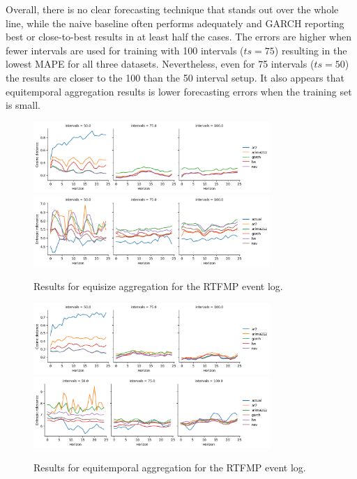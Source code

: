 Overall, there is no clear forecasting technique that stands out over the whole line, while the naive baseline often performs adequately and GARCH reporting best or close-to-best results in at least half the cases.
The errors are higher when fewer intervals are used for training with 100 intervals ($ts=75$) resulting in the lowest MAPE for all three datasets.
Nevertheless, even for 75 intervals ($ts=50$) the results are closer to the 100 than the 50 interval setup.
It also appears that equitemporal aggregation results is lower forecasting errors when the training set is small.
\begin{figure}
    \centering
    \includegraphics[width=0.8\textwidth]{img/rtfmp_cosine_small_equisize.png}
    \includegraphics[width=0.8\textwidth]{img/rtfmp_entropic_small_equisize.png}
    \caption{Results for equisize aggregation for the RTFMP event log.}
    \label{fig:rtfmp_equisize}
\end{figure}
\begin{figure}
    \centering
    \includegraphics[width=0.8\textwidth]{img/rtfmp_cosine_small_equitemp.png}
    \includegraphics[width=0.8\textwidth]{img/rtfmp_entropic_small_equitemp.png}
    \caption{Results for equitemporal aggregation for the RTFMP event log.}
    \label{fig:rtfmp_equitemp}
\end{figure}

